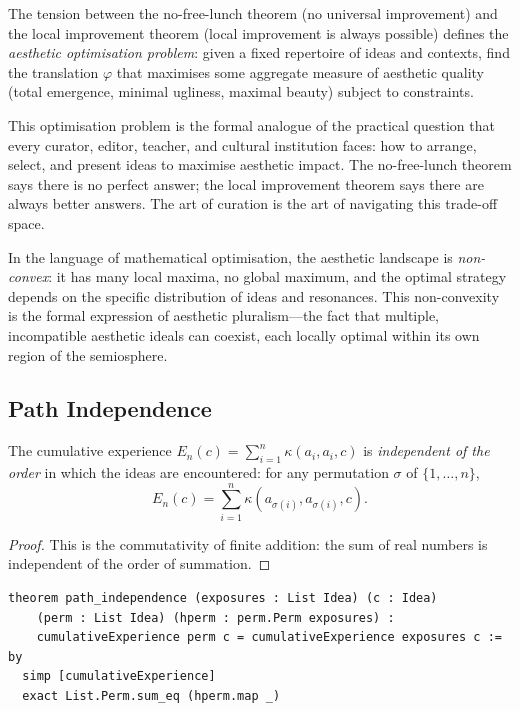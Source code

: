 \begin{interpretation}
\label{interp:aesthetic-optimisation}
The tension between the no-free-lunch theorem (no universal improvement) and the local improvement theorem (local improvement is always possible) defines the \emph{aesthetic optimisation problem}: given a fixed repertoire of ideas and contexts, find the translation $\varphi$ that maximises some aggregate measure of aesthetic quality (total emergence, minimal ugliness, maximal beauty) subject to constraints.

This optimisation problem is the formal analogue of the practical question that every curator, editor, teacher, and cultural institution faces: how to arrange, select, and present ideas to maximise aesthetic impact.  The no-free-lunch theorem says there is no perfect answer; the local improvement theorem says there are always better answers.  The art of curation is the art of navigating this trade-off space.

In the language of mathematical optimisation, the aesthetic landscape is \emph{non-convex}: it has many local maxima, no global maximum, and the optimal strategy depends on the specific distribution of ideas and resonances.  This non-convexity is the formal expression of aesthetic pluralism---the fact that multiple, incompatible aesthetic ideals can coexist, each locally optimal within its own region of the semiosphere.
\end{interpretation}

\subsection{Path Independence}

\begin{theorem}
\label{thm:path-independence}
The cumulative experience $E_n(c) = \sum_{i=1}^{n} \kappa(a_i, a_i, c)$ is
\emph{independent of the order} in which the ideas are encountered:
for any permutation $\sigma$ of $\{1, \ldots, n\}$,
\[
  E_n(c) = \sum_{i=1}^{n} \kappa(a_{\sigma(i)}, a_{\sigma(i)}, c).
\]
\end{theorem}

\begin{proof}
This is the commutativity of finite addition: the sum of real numbers
is independent of the order of summation.
\end{proof}

\begin{lstlisting}
theorem path_independence (exposures : List Idea) (c : Idea)
    (perm : List Idea) (hperm : perm.Perm exposures) :
    cumulativeExperience perm c = cumulativeExperience exposures c := by
  simp [cumulativeExperience]
  exact List.Perm.sum_eq (hperm.map _)
\end{lstlisting}

